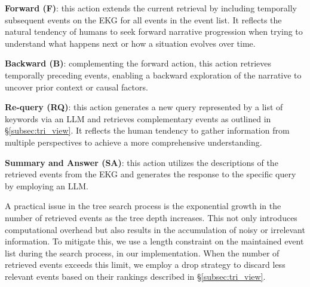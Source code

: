     
\textbf{Forward (F)}: this action extends the current retrieval by including temporally subsequent events on the EKG for all events in the event list. It reflects the natural tendency of humans to seek forward narrative progression when trying to understand what happens next or how a situation evolves over time.
    
\textbf{Backward (B)}: complementing the forward action, this action retrieves temporally preceding events, enabling a backward exploration of the narrative to uncover prior context or causal factors.
    
\textbf{Re-query (RQ)}: this action generates a new query represented by a list of keywords via an LLM and retrieves complementary events as outlined in \S\ref{subsec:tri_view}. It reflects the human tendency to gather information from multiple perspectives to achieve a more comprehensive understanding.

\textbf{Summary and Answer (SA)}: this action utilizes the descriptions of the retrieved events from the EKG and generates the response to the specific query by employing an LLM.











A practical issue in the tree search process is the exponential growth in the number of retrieved events as the tree depth increases. This not only introduces computational overhead but also results in the accumulation of noisy or irrelevant information. To mitigate this, we use a length constraint on the maintained event list during the search process,  in our implementation. When the number of retrieved events exceeds this limit, we employ a drop strategy to discard less relevant events based on their rankings described in \S\ref{subsec:tri_view}.




